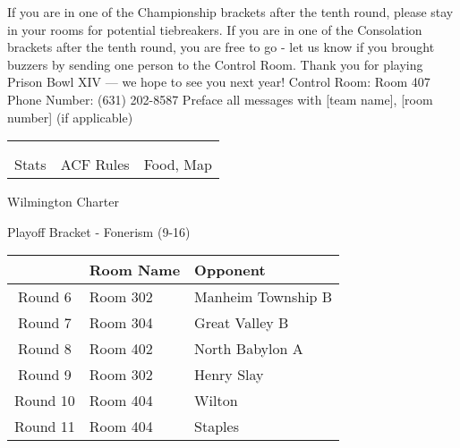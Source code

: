 \documentclass{article}%
\begin{document}
\vspace*{30pt}%
\linebreak%
If you are in one of the Championship brackets after the tenth round, please stay in your rooms for potential tiebreakers.\newline%
\newline%
If you are in one of the Consolation brackets after the tenth round, you are free to go {-} let us know if you brought buzzers by sending one person to the Control Room.\newline%
\newline%
Thank you for playing Prison Bowl XIV — we hope to see you next year!\newline%
\newline%
Control Room: Room 407\newline%
Phone Number: (631) 202{-}8587\newline%
Preface all messages with {[}team name{]}, {[}room number{]} (if applicable)%
\vspace*{30pt}%
\newline%
%
\begin{tabularx}{\textwidth}{YYY}%
  &  &  \\%
\\%
Stats&ACF Rules&Food, Map\\%
\end{tabularx}%
\newpage%
\begin{center}%
\begin{Huge}%
Wilmington Charter%
\end{Huge}%
\vspace*{12pt}%
\linebreak%
\begin{Large}%
Playoff Bracket {-} Fonerism (9{-}16)%
\end{Large}%
\end{center}%
\vspace*{4pt}%
%
\begin{tabularx}{\textwidth}{|c|Y|Y|}%
\hline%
&Room Name&Opponent\\%
\hline%
Round 6&Room 302&Manheim Township B\\%
Round 7&Room 304&Great Valley B\\%
Round 8&Room 402&North Babylon A\\%
Round 9&Room 302&Henry Slay\\%
Round 10&Room 404&Wilton\\%
Round 11&Room 404&Staples\\%
\hline%
\end{tabularx}%
\end{document}
